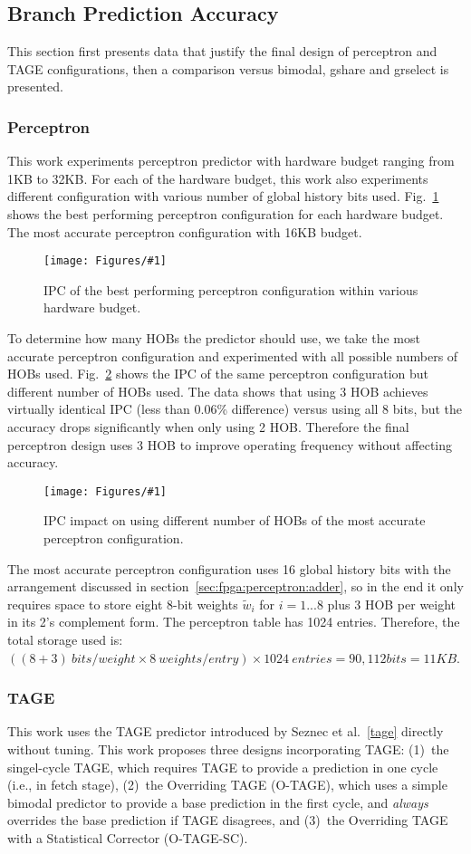 \documentclass[conference]{IEEEtran}
\newcommand{\kfig}[4]{ %
        \begin{figure}[!t]
        \centering
        \texttt{[image: Figures/\#1]}
        \vspace{-1mm}
        \caption{#3}
        \label{#2}
        \end{figure}
}
\begin{document}
\subsection{Branch Prediction Accuracy}
\label{sec:eval:ipc}
This section first presents data that justify the final design of perceptron and TAGE configurations, then a comparison versus bimodal, gshare and grselect is presented.

\subsubsection{Perceptron}
\label{sec:eval:ipc:perceptron}
This work experiments perceptron predictor with hardware budget ranging from 1KB to 32KB. For each of the hardware budget, this work also experiments different configuration with various number of global history bits used. Fig.~\ref{fig:perceptronIPC} shows the best performing perceptron configuration for each hardware budget. The most accurate perceptron configuration with 16KB budget.
\kfig{perceptronIPC.pdf}{fig:perceptronIPC}{IPC of the best performing perceptron configuration within various hardware budget.}{angle = 0, trim = 0.9in 4in 0.8in 4.5in, clip, width=0.4\textwidth}

To determine how many HOBs the predictor should use, we take the most accurate perceptron configuration and experimented with all possible numbers of HOBs used. Fig.~\ref{fig:perceptronHOB} shows the IPC of the same perceptron configuration but different number of HOBs used. The data shows that using 3 HOB achieves virtually identical IPC (less than 0.06\% difference) versus using all 8 bits, but the accuracy drops significantly when only using 2 HOB. Therefore the final perceptron design uses 3 HOB to improve operating frequency without affecting accuracy.
\kfig{perceptronHOB.pdf}{fig:perceptronHOB}{IPC impact on using different number of HOBs of the most accurate perceptron configuration.}{angle = 0, trim = 1in 1.5in 0.9in 1.7in, clip, width=0.4\textwidth}

The most accurate perceptron configuration uses 16 global history bits with the arrangement discussed in section~\ref{sec:fpga:perceptron:adder}, so in the end it only requires space to store eight 8-bit weights $\widetilde{w}_{i}$ for $i = 1...8$ plus 3 HOB per weight in its 2's complement form. The perceptron table has 1024 entries. Therefore, the total storage used is: $ ((8+ 3)\ bits/weight \times 8\ weights/entry)\times 1024\ entries  = 90,112 bits = 11KB$. 

\subsubsection{TAGE}
\label{sec:eval:ipc:tage}
This work uses the TAGE predictor introduced by Seznec et al.~\ref{tage} directly without tuning.  This work proposes three designs incorporating TAGE:  (1)~the singel-cycle TAGE, which requires TAGE to provide a prediction in one cycle (i.e., in fetch stage), (2)~the Overriding TAGE (O-TAGE), which uses a simple bimodal predictor to provide a base prediction in the first cycle, and \textit{always} overrides the base prediction if TAGE disagrees, and (3)~the Overriding TAGE with a Statistical Corrector (O-TAGE-SC).
\end{document}
